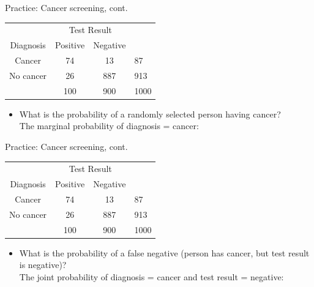\documentclass[xcolor=table, aspectratio=169, bigger]{beamer}
\begin{document}
\begin{frame}{Practice: Cancer screening, cont.}
\begin{block}{}
{\centering
\begin{tabular}{c | c  c | l}
\multicolumn{1}{c}{} & \multicolumn{2}{c}{Test Result}\\
Diagnosis & Positive & Negative \\
\hline
Cancer & 74 & 13 & 87\\
No cancer & 26 & 887 & 913\\
\hline
& 100 & 900 & 1000
\end{tabular}\par
}
\end{block}

\begin{exampleblock}{}
\begin{itemize}
\item What is the probability of a randomly selected person having cancer?\\
\pause
\medskip
The marginal probability of diagnosis = cancer:\\
\pause\medskip
\smallskip{}
\end{itemize}
\end{exampleblock}
\end{frame}

\begin{frame}{Practice: Cancer screening, cont.}
\begin{block}{}
{\centering
\begin{tabular}{c | c  c | l}
\multicolumn{1}{c}{} & \multicolumn{2}{c}{Test Result}\\
Diagnosis & Positive & Negative \\
\hline
Cancer & 74 & 13 & 87\\
No cancer & 26 & 887 & 913\\
\hline
& 100 & 900 & 1000
\end{tabular}\par
}
\end{block}

\begin{exampleblock}{}
\begin{itemize}
\item What is the probability of a false negative (person has cancer, but test result is negative)?\\
\pause\medskip
The joint probability of diagnosis = cancer and test result = negative:\\
\pause\medskip
{}
\end{itemize}
\end{exampleblock}
\end{frame}
\end{document}
